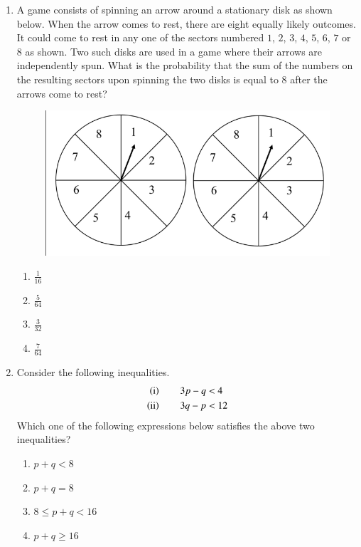 \documentclass[journal]{IEEEtran}
\begin{document}
\begin{enumerate}
\item A game consists of spinning an arrow around a stationary disk as shown below. When the arrow comes to rest, there are eight equally likely outcomes. It could come to rest in any one of the sectors numbered $1$, $2$, $3$, $4$, $5$, $6$, $7$ or $8$ as shown. Two such disks are used in a game where their arrows are independently spun. What is the probability that the sum of the numbers on the resulting sectors upon spinning the two disks is equal to $8$ after the arrows come to rest?

\hfill{}
\begin{figure}[H]
\centering
\includegraphics[width = 0.5\columnwidth]{figs/02.png}
\caption*{}
\label{fig:q7}
\end{figure}
\begin{enumerate}
\item $\frac{1}{16}$
\vspace{0.3cm}
\item $\frac{5}{64}$
\vspace{0.3cm}
\item $\frac{3}{32}$
\vspace{0.3cm}
\item $\frac{7}{64}$
\end{enumerate}

\item Consider the following inequalities.
\begin{align*}
\left(\text{i}\right) \qquad 3p-q&<4\\
\left(\text{ii}\right)\qquad 3q-p&<12
\end{align*}
Which one of the following expressions below satisfies the above two inequalities?

\hfill{}
\begin{enumerate}
\item $p+q<8$
\item $p+q=8$
\item $8\le p+q<16$
\item $p+q\ge16$
\end{enumerate}


\end{enumerate}
\end{document}
